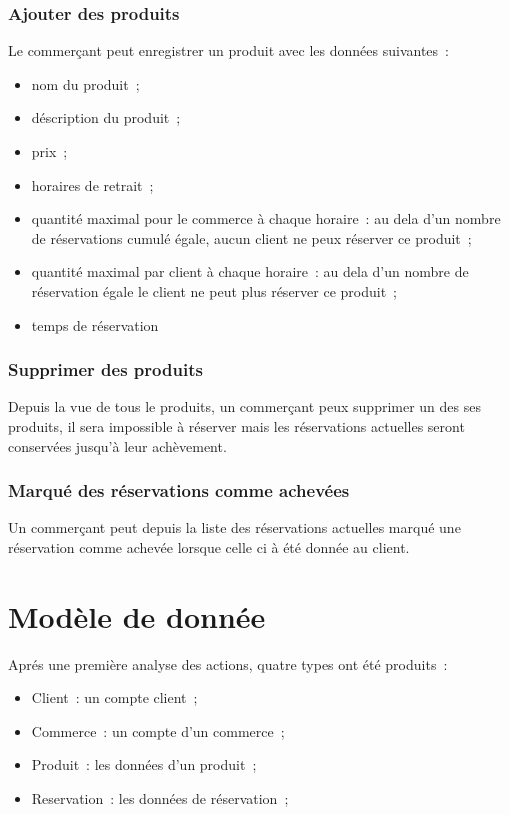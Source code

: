 \documentclass[a4paper,12pt]{article}
\begin{document}
\subsubsection{Ajouter des produits}

Le commerçant peut enregistrer un produit avec les données suivantes~:

\begin{itemize}
	\item nom du produit~;
	\item déscription du produit~;
	\item prix~;
	\item horaires de retrait~;
	\item quantité maximal pour le commerce à chaque horaire~: au dela d'un nombre de réservations cumulé égale, aucun client ne peux réserver ce produit~;
	\item quantité maximal par client à chaque horaire~: au dela d'un nombre de réservation égale le client ne peut plus réserver ce produit~;
	\item temps de réservation 
\end{itemize}


\subsubsection{Supprimer des produits}

Depuis la vue de tous le produits, un commerçant peux supprimer un des ses produits, il sera impossible à réserver mais les réservations actuelles seront conservées jusqu'à leur achèvement.

\subsubsection{Marqué des réservations comme achevées}

Un commerçant peut depuis la liste des réservations actuelles marqué une réservation comme achevée lorsque celle ci à été donnée au client.

\section{Modèle de donnée}

Aprés une première analyse des actions, quatre types ont été produits~:
\begin{itemize}
	\item Client~: un compte client~;
	\item Commerce~: un compte d'un commerce~;
	\item Produit~: les données d'un produit~;
	\item Reservation~: les données de réservation~;
\end{itemize}
\end{document}
